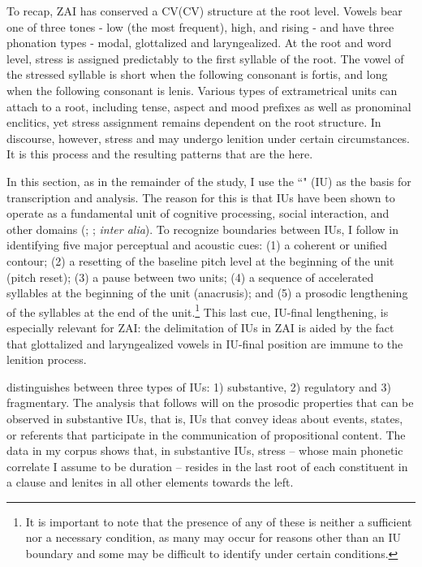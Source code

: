 To recap, ZAI has conserved a CV(CV) structure at the root level. Vowels bear one of three tones - low (the most frequent), high, and rising - and have three phonation types - modal, glottalized and laryngealized. At the root and word level, stress is assigned predictably to the first syllable of the root. The vowel of the stressed syllable is short when the following consonant is fortis, and long when the following consonant is lenis. Various types of extrametrical units can attach to a root, including tense, aspect and mood prefixes as well as pronominal enclitics, yet stress assignment remains dependent on the root structure. In discourse, however, stress and  may undergo lenition under certain circumstances. It is this process and the resulting patterns that are the  here.  

In this section, as in the remainder of the study, I use the ``" (IU) \citep{chafe1994} as the basis for transcription and analysis. The reason for this is that IUs have been shown to operate as a fundamental unit of cognitive processing, social interaction, and other domains (\citealt{chafe1994}; \citealt{dubois1993}; \textit{inter alia}). To recognize boundaries between IUs, I follow \citet[100]{dubois1992} in identifying five major perceptual and acoustic cues: 
(1) a coherent or unified  contour; 
(2) a resetting of the baseline pitch level at the beginning of the unit (pitch reset); 
(3) a pause between two units; 
(4) a sequence of accelerated syllables at the beginning of the unit (anacrusis); and 
(5) a prosodic lengthening of the syllables at the end of the unit.\footnote{It is important to note that the presence of any of these is neither a sufficient nor a necessary condition, as many may occur for reasons other than an IU boundary and some may be difficult to identify under certain conditions.} This last cue, IU-final lengthening, is especially relevant for ZAI: the delimitation of IUs in ZAI is aided by the fact that  glottalized and laryngealized vowels in IU-final position are immune to the lenition process.

\citet{chafe1994} distinguishes between three types of IUs: 1) substantive, 2) regulatory and 3) fragmentary. The analysis that follows will  on the prosodic properties that can be observed in substantive IUs, that is, IUs that convey ideas about events, states, or referents that participate in the communication of propositional content. The data in my corpus shows that, in substantive IUs, stress -- whose main phonetic correlate I assume to be duration -- resides in the last root of each constituent in a clause and lenites in all other elements towards the left. 

